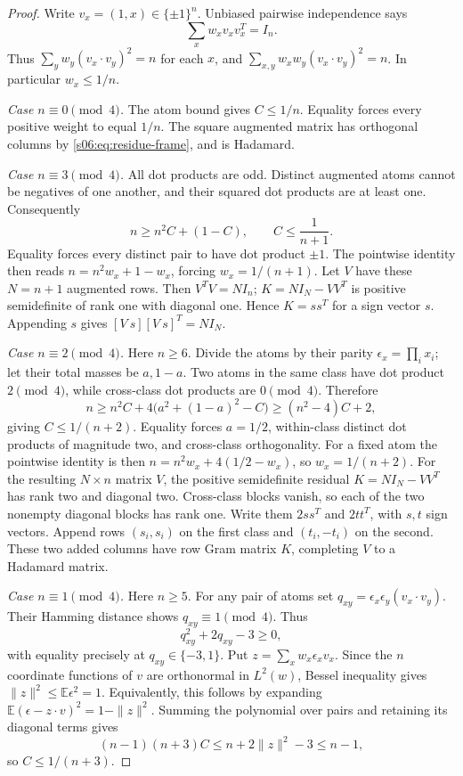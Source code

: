 \begin{proof}
Write $v_x=(1,x)\in\{\pm1\}^n$. Unbiased pairwise independence says
\begin{equation}\label{s06:eq:residue-frame}
 \sum_xw_xv_xv_x^T=I_n.
\end{equation}
Thus $\sum_yw_y(v_x\cdot v_y)^2=n$ for each $x$, and
$\sum_{x,y}w_xw_y(v_x\cdot v_y)^2=n$.
In particular $w_x\le1/n$.

\emph{Case $n\equiv0\pmod4$.}
The atom bound gives $C\le1/n$. Equality forces every positive weight
to equal $1/n$. The square augmented matrix has orthogonal columns
by \eqref{s06:eq:residue-frame}, and is Hadamard.

\emph{Case $n\equiv3\pmod4$.}
All dot products are odd. Distinct augmented atoms cannot be negatives
of one another, and their squared dot products are at least one.
Consequently
\[
 n\ge n^2C+(1-C),\qquad C\le\frac1{n+1}.
\]
Equality forces every distinct pair to have dot product $\pm1$.
The pointwise identity then reads
$n=n^2w_x+1-w_x$, forcing $w_x=1/(n+1)$.
Let $V$ have these $N=n+1$ augmented rows. Then $V^TV=NI_n$;
$K=NI_N-VV^T$ is positive semidefinite of rank one with diagonal
one. Hence $K=ss^T$ for a sign vector $s$. Appending $s$ gives
$[V\ s][V\ s]^T=NI_N$.

\emph{Case $n\equiv2\pmod4$.}
Here $n\ge6$. Divide the atoms by their parity
$\epsilon_x=\prod_i x_i$; let their total masses be $a,1-a$.
Two atoms in the same class have dot product $2\pmod4$, while
cross-class dot products are $0\pmod4$. Therefore
\[
 n\ge n^2C+4\big(a^2+(1-a)^2-C\big)
       \ge(n^2-4)C+2,
\]
giving $C\le1/(n+2)$. Equality forces $a=1/2$, within-class
distinct dot products of magnitude two, and cross-class orthogonality.
For a fixed atom the pointwise identity is then
$n=n^2w_x+4(1/2-w_x)$, so $w_x=1/(n+2)$.
For the resulting $N\times n$ matrix $V$, the positive semidefinite
residual $K=NI_N-VV^T$ has rank two and diagonal two. Cross-class
blocks vanish, so each of the two nonempty diagonal blocks has rank
one. Write them $2ss^T$ and $2tt^T$, with $s,t$ sign vectors.
Append rows $(s_i,s_i)$ on the first class and $(t_i,-t_i)$ on the
second. These two added columns have row Gram matrix $K$, completing
$V$ to a Hadamard matrix.

\emph{Case $n\equiv1\pmod4$.}
Here $n\ge5$. For any pair of atoms set
$q_{xy}=\epsilon_x\epsilon_y(v_x\cdot v_y)$.
Their Hamming distance shows $q_{xy}\equiv1\pmod4$. Thus
\[
 q_{xy}^2+2q_{xy}-3\ge0,
\]
with equality precisely at $q_{xy}\in\{-3,1\}$.
Put $z=\sum_xw_x\epsilon_xv_x$. Since the $n$ coordinate functions
of $v$ are orthonormal in $L^2(w)$, Bessel inequality gives
$\|z\|^2\le\mathbb E\epsilon^2=1$. Equivalently, this follows by
expanding $\mathbb E(\epsilon-z\cdot v)^2=1-\|z\|^2$.
Summing the polynomial over pairs and retaining its diagonal terms gives
\[
 (n-1)(n+3)C\le n+2\|z\|^2-3\le n-1,
\]
so $C\le1/(n+3)$.


\end{proof}
